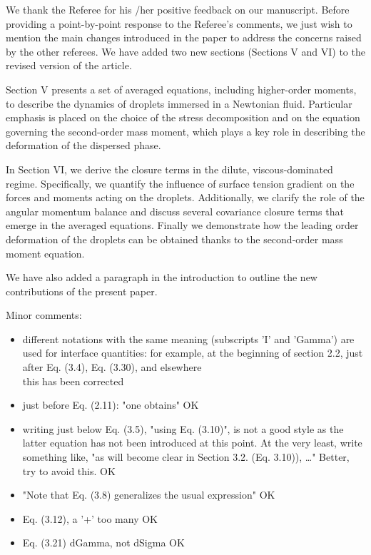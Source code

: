 \documentclass[10pt,a4paper]{article}
\newcommand{\tb}[1]{\color{blue}#1\color{black}}
\begin{document}
\tb{
We thank the Referee for his /her positive feedback on our manuscript. 
Before providing a point-by-point response to the Referee’s comments, we just wish to mention the main changes introduced in the paper to address the concerns raised by the other referees.
We have added two new sections (Sections V and VI) to the revised version of the article.

Section V presents a set of averaged equations, including higher-order moments, to describe the dynamics of droplets immersed in a Newtonian fluid. 
Particular emphasis is placed on the choice of the stress decomposition and on the equation governing the second-order mass moment, which plays a key role in describing the deformation of the dispersed phase.

In Section VI, we derive the closure terms in the dilute, viscous-dominated regime. 
Specifically, we quantify the influence of surface tension gradient on the forces and moments acting on the droplets. 
Additionally, we clarify the role of the angular momentum balance and discuss several covariance closure terms that emerge in the averaged equations.
Finally we demonstrate how the leading order deformation of the droplets can be obtained thanks to the second-order mass moment equation.

We have also added a paragraph in the introduction to outline the new contributions of the present paper.

}

Minor comments:
\begin{itemize}
    \item  different notations with the same meaning (subscripts 'I' and 'Gamma') are used for interface quantities: for example, at the beginning of section 2.2, just after Eq. (3.4), Eq. (3.30), and elsewhere
    \\
    \tb{this has been corrected}
    \item just before Eq. (2.11): "one obtains" \tb{OK}
    \item writing just below Eq. (3.5), "using Eq. (3.10)", is not a good style as the latter equation has not been introduced at this point. At the very least, write something like, "as will become clear in Section 3.2. (Eq. 3.10)), …" Better, try to avoid this. \tb{OK}
    \item "Note that Eq. (3.8) generalizes the usual expression" \tb{OK}
    \item Eq. (3.12), a '+' too many \tb{OK}
    \item Eq. (3.21) dGamma, not dSigma \tb{OK}
\end{itemize}
\end{document}
